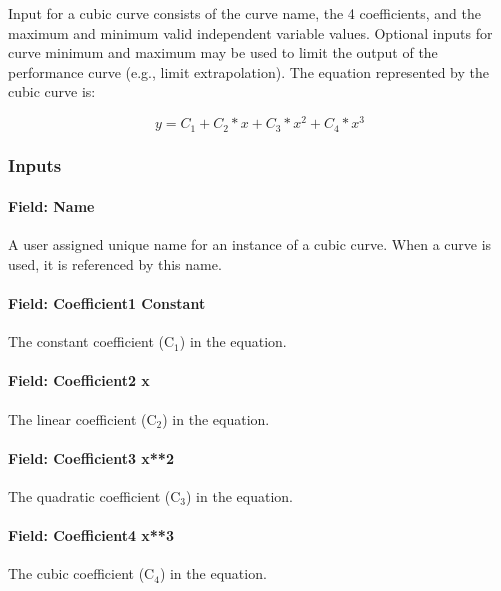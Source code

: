 Input for a cubic curve consists of the curve name, the 4 coefficients, and the maximum and minimum valid independent variable values. Optional inputs for curve minimum and maximum may be used to limit the output of the performance curve (e.g., limit extrapolation). The equation represented by the cubic curve is:

\begin{equation}
y = {C_1} + {C_2}*x + {C_3}*{x^2} + {C_4}*{x^3}
\end{equation}

\subsubsection{Inputs}\label{inputs-3-024}

\paragraph{Field: Name}\label{field-name-3-021}

A user assigned unique name for an instance of a cubic curve. When a curve is used, it is referenced by this name.

\paragraph{Field: Coefficient1 Constant}\label{field-coefficient1-constant-3}

The constant coefficient (C\(_{1}\)) in the equation.

\paragraph{Field: Coefficient2 x}\label{field-coefficient2-x-2}

The linear coefficient (C\(_{2}\)) in the equation.

\paragraph{Field: Coefficient3 x**2}\label{field-coefficient3-x2-1}

The quadratic coefficient (C\(_{3}\)) in the equation.

\paragraph{Field: Coefficient4 x**3}\label{field-coefficient4-x3}

The cubic coefficient (C\(_{4}\)) in the equation.

